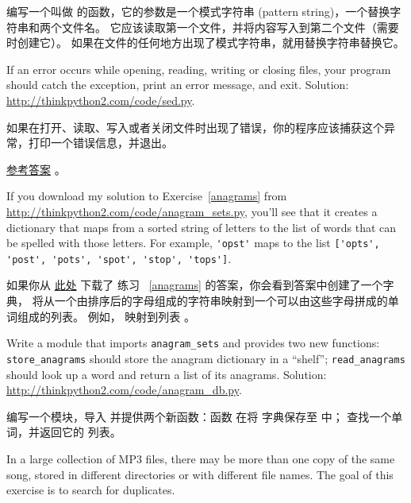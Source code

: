 {{{{{{{\begin{exercise}
编写一个叫做  的函数，它的参数是一个模式字符串 (pattern string)，一个替换字符串和两个文件名。
它应该读取第一个文件，并将内容写入到第二个文件（需要时创建它）。
如果在文件的任何地方出现了模式字符串，就用替换字符串替换它。

If an error occurs while opening, reading, writing or closing files,
your program should catch the exception, print an error message, and
exit.  Solution: \url{http://thinkpython2.com/code/sed.py}.

如果在打开、读取、写入或者关闭文件时出现了错误，你的程序应该捕获这个异常，打印一个错误信息，并退出。

\href{http://thinkpython2.com/code/sed.py}{参考答案} 。

\end{exercise}


\begin{exercise}

If you download my solution to Exercise~\ref{anagrams} from
\url{http://thinkpython2.com/code/anagram_sets.py}, you'll see that it creates
a dictionary that maps from a sorted string of letters to the list of
words that can be spelled with those letters.  For example,
\verb"'opst'" maps to the list
\verb"['opts', 'post', 'pots', 'spot', 'stop', 'tops']".

如果你从 \href{http://thinkpython2.com/code/anagram_sets.py}{此处} 下载了 练习~ \ref{anagrams} 的答案，你会看到答案中创建了一个字典，
将从一个由排序后的字母组成的字符串映射到一个可以由这些字母拼成的单词组成的列表。 例如，  映射到列表  。

Write a module that imports \verb"anagram_sets" and provides
two new functions: \verb"store_anagrams" should store the
anagram dictionary in a ``shelf''; \verb"read_anagrams" should
look up a word and return a list of its anagrams.
Solution: \url{http://thinkpython2.com/code/anagram_db.py}.

编写一个模块，导入  并提供两个新函数：函数  在将  字典保存至 中； 
 查找一个单词，并返回它的  列表。

\end{exercise}

\begin{exercise}
\label{checksum}

In a large collection of MP3 files, there may be more than one
copy of the same song, stored in different directories or with
different file names.  The goal of this exercise is to search for
duplicates.


\end{exercise}}}}}}}}
